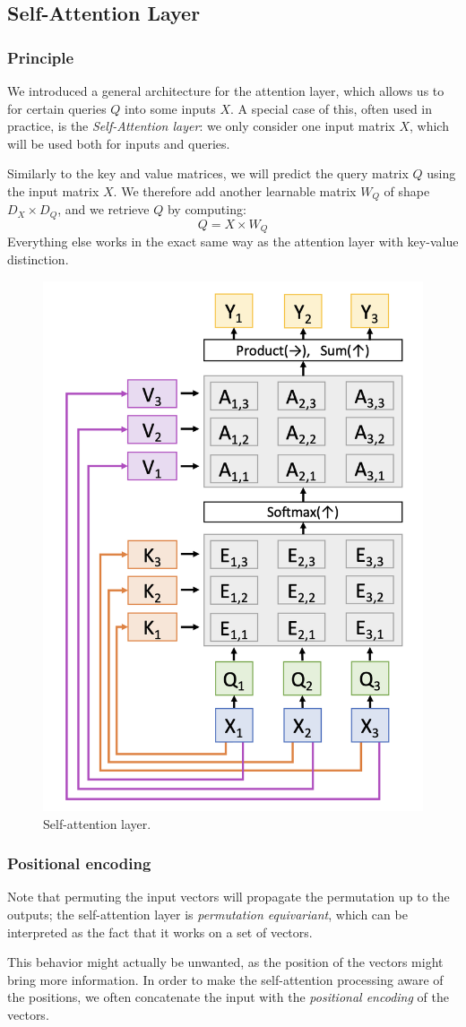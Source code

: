 \subsection{Self-Attention Layer}
\subsubsection{Principle}
We introduced a general architecture for the attention layer, which allows us to  for certain queries $Q$ into some inputs $X$. A special case of this, often used in practice, is the \emph{Self-Attention layer}: we only consider one input matrix $X$, which will be used both for inputs and queries.

Similarly to the key and value matrices, we will predict the query matrix $Q$ using the input matrix $X$. We therefore add another learnable matrix $W_Q$ of shape $D_X\times D_Q$, and we retrieve $Q$ by computing:
\begin{equation*}
    Q = X\times W_Q
\end{equation*}
Everything else works in the exact same way as the attention layer with key-value distinction.

\begin{figure}[H]
    \centering
    \includegraphics[width=.35\textwidth]{images/self-attention-layer.png}
    \caption{Self-attention layer.}
\end{figure}

\subsubsection{Positional encoding}
Note that permuting the input vectors will propagate the permutation up to the outputs; the self-attention layer is \emph{permutation equivariant}, which can be interpreted as the fact that it works on a set of vectors. 

This behavior might actually be unwanted, as the position of the vectors might bring more information. In order to make the self-attention processing aware of the positions, we often concatenate the input with the \emph{positional encoding} of the vectors.

